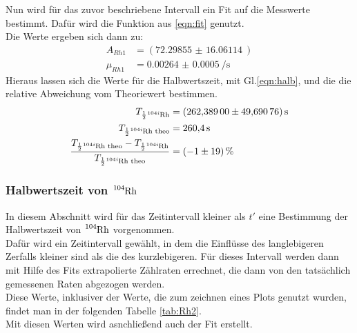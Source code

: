 \noindent
Nun wird für das zuvor beschriebene Intervall ein Fit auf die Messwerte bestimmt. 
Dafür wird die Funktion aus \ref{eqn:fit} genutzt.\\
Die Werte ergeben sich dann zu:
\begin{align*}
    A_{Rh1}&=(\SI{72.29855(1606114)}{})\\
    \mu_{Rh1}&=\SI{0.00264(000050)}{\per\second}
\end{align*}
Hieraus lassen sich die Werte für die Halbwertszeit, mit Gl.\ref{eqn:halb}, und die die relative Abweichung vom Theoriewert\cite{Rhodium} bestimmen.
\begin{align*}
    T_{\frac{1}{2}\ce{^{104i}_{}Rh}}&= \SI{262.38900(4969076)}{\second}\\
    T_{\frac{1}{2}\ce{^{104i}_{}Rh}\text{ theo}}&= \SI{260.4}{\second}\\
    \frac{T_{\frac{1}{2}\ce{^{104i}_{}Rh} \text{ theo}} - T_{\frac{1}{2}\ce{^{104i}_{}Rh}}}{T_{\frac{1}{2}\ce{^{104i}_{}Rh}\text{ theo}}}&=\SI{-01(19)}{\percent}
\end{align*}

\subsubsection{Halbwertszeit von $\ce{^{\text{104}}_{}\text{Rh}}$}

In diesem Abschnitt wird für das Zeitintervall kleiner als $t'$ eine Bestimmung der Halbwertszeit von $\ce{^{104}_{}Rh}$ vorgenommen.\\
Dafür wird ein Zeitintervall gewählt, in dem die Einflüsse des langlebigeren Zerfalls kleiner sind als die des kurzlebigeren.
Für dieses Intervall werden dann mit Hilfe des Fits extrapolierte Zählraten errechnet, die dann von den tatsächlich gemessenen Raten abgezogen werden.\\
Diese Werte, inklusiver der Werte, die zum zeichnen eines Plots genutzt wurden, findet man in der folgenden Tabelle \ref{tab:Rh2}.\\
Mit diesen Werten wird asnchließend auch der Fit erstellt.\\

